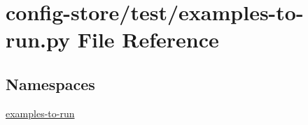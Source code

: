 \hypertarget{config-store_2test_2examples-to-run_8py}{}\section{config-\/store/test/examples-\/to-\/run.py File Reference}
\label{config-store_2test_2examples-to-run_8py}
\subsection*{Namespaces}
\begin{DoxyCompactItemize}
\item 
 \hyperlink{namespaceexamples-to-run}{examples-\/to-\/run}
\end{DoxyCompactItemize}
